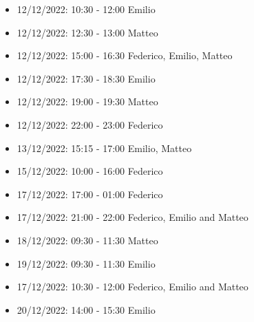 \begin{itemize}
    \item 12/12/2022: 10:30 - 12:00 Emilio
    \item 12/12/2022: 12:30 - 13:00 Matteo
    \item 12/12/2022: 15:00 - 16:30 Federico, Emilio, Matteo
    \item 12/12/2022: 17:30 - 18:30 Emilio
    \item 12/12/2022: 19:00 - 19:30 Matteo
    \item 12/12/2022: 22:00 - 23:00 Federico
    \item 13/12/2022: 15:15 - 17:00 Emilio, Matteo
    \item 15/12/2022: 10:00 - 16:00 Federico
    \item 17/12/2022: 17:00 - 01:00 Federico
    \item 17/12/2022: 21:00 - 22:00 Federico, Emilio and Matteo
    \item 18/12/2022: 09:30 - 11:30 Matteo
    \item 19/12/2022: 09:30 - 11:30 Emilio
    \item 17/12/2022: 10:30 - 12:00 Federico, Emilio and Matteo
    \item 20/12/2022: 14:00 - 15:30 Emilio
\end{itemize}